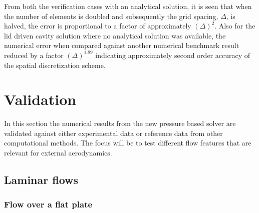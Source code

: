 From both the verification cases with an analytical solution, it is seen that when the number of elements is doubled and subsequently the grid spacing, $\Delta$, is halved, the error is proportional to a factor of approximately $(\Delta)^2$. Also for the lid driven cavity solution where no analytical solution was available, the numerical error when compared against another numerical benchmark result reduced by a factor $(\Delta)^{1.89}$ indicating approximately second order accuracy of the spatial discretization scheme.


\section{Validation}
In this section the numerical results from the new pressure based solver are validated against either experimental data or reference data from other computational methods. The focus will be to test different flow features that are relevant for external aerodynamics.
\subsection{Laminar flows}\label{ssec:blasisus}

\subsubsection{Flow over a flat plate}

